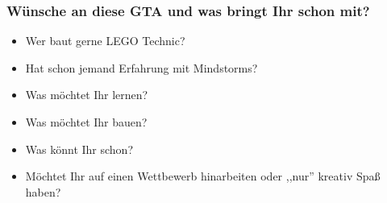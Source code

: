 \documentclass{beamer}
\begin{document}
\begin{frame}
\frametitle{Wünsche an diese GTA und was bringt Ihr schon mit?}
\begin{itemize}
\item Wer baut gerne LEGO Technic?
\item Hat schon jemand Erfahrung mit Mindstorms?
\item  Was möchtet Ihr lernen?
\item  Was möchtet Ihr bauen?
\item   Was könnt Ihr schon?
\item   Möchtet Ihr auf einen Wettbewerb hinarbeiten oder ,,nur'' kreativ Spaß haben?
\end{itemize}
\end{frame}
\end{document}
